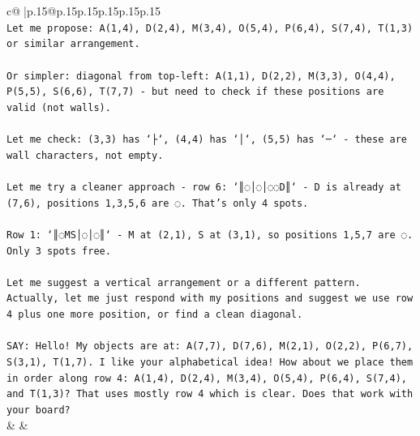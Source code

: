 \documentclass{article}
\begin{document}
{\begin{supertabular}{c@{$\;$}|p{.15\linewidth}@{}p{.15\linewidth}p{.15\linewidth}p{.15\linewidth}p{.15\linewidth}p{.15\linewidth}}
{{{\\ 
\texttt{Let me propose: A(1,4), D(2,4), M(3,4), O(5,4), P(6,4), S(7,4), T(1,3) or similar arrangement.} \\
\\ 
\texttt{Or simpler: diagonal from top{-}left: A(1,1), D(2,2), M(3,3), O(4,4), P(5,5), S(6,6), T(7,7) {-} but need to check if these positions are valid (not walls).} \\
\\ 
\texttt{Let me check: (3,3) has `├`, (4,4) has `│`, (5,5) has `─` {-} these are wall characters, not empty.} \\
\\ 
\texttt{Let me try a cleaner approach {-} row 6: `║◌│◌│◌◌D║` {-} D is already at (7,6), positions 1,3,5,6 are ◌. That's only 4 spots.} \\
\\ 
\texttt{Row 1: `║◌MS│◌│◌║` {-} M at (2,1), S at (3,1), so positions 1,5,7 are ◌. Only 3 spots free.} \\
\\ 
\texttt{Let me suggest a vertical arrangement or a different pattern. Actually, let me just respond with my positions and suggest we use row 4 plus one more position, or find a clean diagonal.} \\
\\ 
\texttt{SAY: Hello! My objects are at: A(7,7), D(7,6), M(2,1), O(2,2), P(6,7), S(3,1), T(1,7). I like your alphabetical idea! How about we place them in order along row 4: A(1,4), D(2,4), M(3,4), O(5,4), P(6,4), S(7,4), and T(1,3)? That uses mostly row 4 which is clear. Does that work with your board?} \\
            }
        }
    }
    & & \\ \\


\end{supertabular}}
\end{document}
